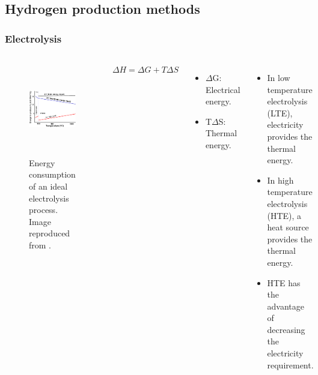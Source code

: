 \subsection{Hydrogen production methods}
\begin{frame}
\frametitle{Electrolysis}
\begin{columns}
    \column[t]{5cm}
	\begin{figure}[htbp!]
		\begin{center}
			\includegraphics[height=4.0cm]{images/ele-curve.png}
		\end{center}
		\caption{Energy consumption of an ideal electrolysis process. Image reproduced from \cite{hi2h2_highly_2007}.}
	\end{figure}

	\column[t]{5cm}
	$\Delta H = \Delta G + T \Delta S$
	\begin{itemize}
		\item $\Delta$G: Electrical energy.
		\item T$\Delta$S: Thermal energy.
	\end{itemize}
    \vspace{0.7cm}

	\begin{itemize}
    	\item In low temperature electrolysis (LTE), electricity provides the thermal energy.
    	\item In high temperature electrolysis (HTE), a heat source provides the thermal energy.
    	\item HTE has the advantage of decreasing the electricity requirement.
    \end{itemize}
\end{columns}
\end{frame}


